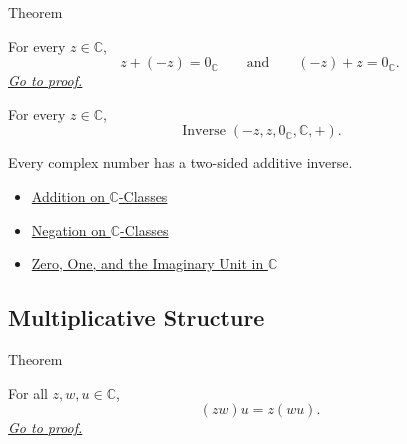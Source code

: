 \begin{theorembox}{Theorem}
\begin{theorem}
\label{thm:every-complex-has-additive-inverse}
For every \(z\in\mathbb{C}\),
\[
z+(-z)=0_{\mathbb{C}}
\qquad\text{and}\qquad
(-z)+z=0_{\mathbb{C}}.
\]
\hyperref[prf:every-complex-has-additive-inverse]{\textit{Go to proof.}}
\end{theorem}
\end{theorembox}


\begin{remark*}
For every $z\in\mathbb{C}$,
\[
\operatorname{Inverse}(-z,z,0_{\mathbb{C}},\mathbb{C},+).
\]
\end{remark*}

\begin{remark*}[Interpretation]
Every complex number has a two-sided additive inverse.
\end{remark*}

\begin{dependencies}
\begin{itemize}
  \item \hyperref[def:addition-on-c-classes]{Addition on $\mathbb{C}$-Classes}
  \item \hyperref[def:negation-on-c-classes]{Negation on $\mathbb{C}$-Classes}
  \item \hyperref[def:zero-one-i-in-c]{Zero, One, and the Imaginary Unit in $\mathbb{C}$}
\end{itemize}
\end{dependencies}

\subsection*{Multiplicative Structure}

\begin{theorembox}{Theorem}
\begin{theorem}
\label{thm:multiplication-on-c-associative}
For all \(z,w,u\in\mathbb{C}\),
\[
(zw)u=z(wu).
\]
\hyperref[prf:multiplication-on-c-associative]{\textit{Go to proof.}}
\end{theorem}
\end{theorembox}

